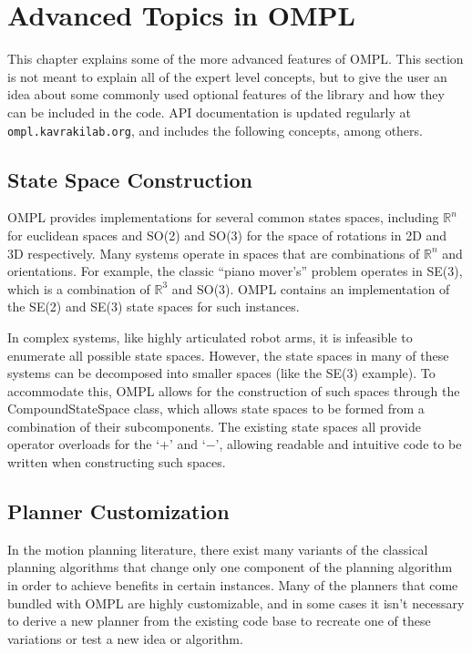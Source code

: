 \chapter{Advanced Topics in OMPL}

This chapter explains some of the more advanced features of OMPL.  This section
is not meant to explain all of the expert level concepts, but to give the user
an idea about some commonly used optional features of the library and how they
can be included in the code.  API documentation is updated regularly at
{\tt ompl.kavrakilab.org}, and includes the following concepts, among others.

\section {State Space Construction}
OMPL provides implementations for several common states spaces, including
${\mathbb R}^n$ for euclidean spaces and SO(2) and SO(3) for the space of
rotations in 2D and 3D respectively.  Many systems operate in spaces
that are combinations of ${\mathbb R}^n$ and orientations.  For example, the
classic ``piano mover's'' problem operates in SE(3), which is a combination
of ${\mathbb R}^3$ and SO(3).  OMPL contains an implementation of the SE(2) and
SE(3) state spaces for such instances.

In complex systems, like highly articulated robot arms, it is infeasible to
enumerate all possible state spaces.  However, the state spaces in many of these
systems can be decomposed into smaller spaces (like the SE(3) example).  To
accommodate this, OMPL allows for the construction of such spaces through the
CompoundStateSpace class, which allows state spaces to be formed from a
combination of their subcomponents.  The existing state spaces all provide
operator overloads for the `+' and `$-$', allowing readable and intuitive code to
be written when constructing such spaces.

\section {Planner Customization}
In the motion planning literature, there exist many variants of the classical
planning algorithms that change only one component of the planning algorithm
in order to achieve benefits in certain instances.  Many of the planners that
come bundled with OMPL are highly customizable, and in some cases it isn't
necessary to derive a new planner from the existing code base to recreate one of
these variations or test a new idea or algorithm.

